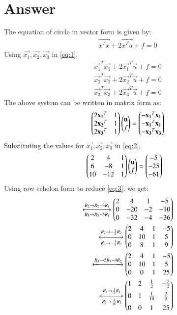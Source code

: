 \documentclass[journal,12pt,twocolumn]{IEEEtran}
\begin{document}
\section{Answer}
The equation of circle in vector form is given by:
\begin{align}
\vec{x^Tx}+2\vec{x^Tu}+f = 0 \label{eq:1}
\end{align}
Using $\vec{x_1}, \vec{x_2}, \vec{x_3}$ in \eqref{eq:1},
\begin{align}
\vec{x_1}^T\vec{x_1}+2\vec{x_1}^T\vec{u}+f=0\\
\vec{x_2}^T\vec{x_2}+2\vec{x_2}^T\vec{u}+f=0\\
\vec{x_3}^T\vec{x_3}+2\vec{x_3}^T\vec{u}+f=0
\end{align}
The above system can be written in matrix form as:
\begin{align}
\begin{pmatrix}2\mathbf{x_1}^T & 1\\2\mathbf{x_2}^T & 1\\2\mathbf{x_3}^T & 1\end{pmatrix}\begin{pmatrix}\mathbf{u}\\f\end{pmatrix}=\begin{pmatrix}-\mathbf{x_1}^T\mathbf{x_1}\\-\mathbf{x_1}^T\mathbf{x_1}\\-\mathbf{x_3}^T\mathbf{x_3}\end{pmatrix} \label{eq:2}
\end{align}
Substituting the values for $\vec{x_1}, \vec{x_2}, \vec{x_3}$ in \eqref{eq:2},
\begin{align}
\begin{pmatrix}2 & 4 & 1\\6 & -8 & 1\\10 & -12 & 1\end{pmatrix}\begin{pmatrix}\mathbf{u}\\f\end{pmatrix}&=\begin{pmatrix}-5\\-25\\-61\end{pmatrix} \label{eq:3}
\end{align}
Using row echelon form to reduce \eqref{eq:3}, we get:
\begin{align}
\xleftrightarrow[R_3\rightarrow R_3-5R_1]{R_2\rightarrow R_2-3R_1}\begin{pmatrix}2 & 4 & 1 & -5\\0 & -20 & -2 & -10\\ 0 & -32 & -4 & -36\end{pmatrix}\\
\xleftrightarrow[R_3\rightarrow -\frac{1}{4}R_3]{R_2 \rightarrow -\frac{1}{2}R_2}\begin{pmatrix}2 & 4 & 1 & -5\\0 & 10 & 1 & 5\\ 0 & 8 & 1 & 9\end{pmatrix}\\
\xleftrightarrow[]{R_3 \rightarrow 5R_3-4R_2}\begin{pmatrix}2 & 4 & 1 & -5\\0 & 10 & 1 & 5\\ 0 & 0 & 1 & 25\end{pmatrix}\\ \label{eq:4}
\xleftrightarrow[R_2 \rightarrow \frac{1}{10}R_2]{R_1 \rightarrow \frac{1}{2}R_1}\begin{pmatrix}1 & 2 & \frac{1}{2} & -\frac{5}{2}\\[0.2cm]0 & 1 & \frac{1}{10} & \frac{2}{5}\\[0.2cm] 0 & 0 & 1 & 25\end{pmatrix}
\end{align}
\end{document}
